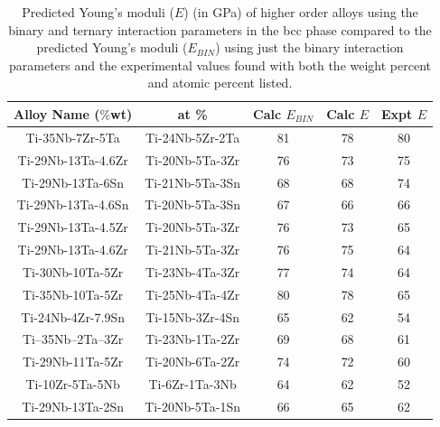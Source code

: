 \newpage
\begin{table}[H]
	\caption{Predicted Young's moduli ($E$) (in GPa) of higher order alloys using the binary and ternary interaction parameters in the bcc phase compared to the predicted Young's moduli ($E_{BIN}$) using just the binary interaction parameters and the experimental values found with both the weight percent and atomic percent listed.}
	\centering
	\begin{tabular}{ c c c c c }
		\hline
		Alloy Name ($\%$wt) & at \% & Calc $E_{BIN}$ & Calc $E$ & Expt $E$\\
		\hline
		Ti-35Nb-7Zr-5Ta \cite{Geetha2009} & Ti-24Nb-5Zr-2Ta & 81 & 78 & 80\\
		Ti-29Nb-13Ta-4.6Zr \cite{Geetha2009}  & Ti-20Nb-5Ta-3Zr & 76 & 73 & 75\\
		Ti-29Nb-13Ta-6Sn \cite{Geetha2009} & Ti-21Nb-5Ta-3Sn & 68 & 68 & 74\\
		Ti-29Nb-13Ta-4.6Sn \cite{Geetha2009} & Ti-20Nb-5Ta-3Sn & 67 & 66 & 66\\
		Ti-29Nb-13Ta-4.5Zr \cite{Geetha2009} & Ti-20Nb-5Ta-3Zr & 76 & 73 & 65\\
		Ti-29Nb-13Ta-4.6Zr \cite{Tane2010a} & Ti-21Nb-5Ta-3Zr & 76 & 75 & 64\\
		Ti-30Nb-10Ta-5Zr \cite{Tane2010a} & Ti-23Nb-4Ta-3Zr & 77 & 74 & 64\\
		Ti-35Nb-10Ta-5Zr \cite{Tane2010a} & Ti-25Nb-4Ta-4Zr & 80 & 78 & 65\\
		Ti-24Nb-4Zr-7.9Sn \cite{Mohammed2014} & Ti-15Nb-3Zr-4Sn & 65 & 62 & 54\\
		Ti–35Nb–2Ta–3Zr \cite{Mohammed2014} & Ti-23Nb-1Ta-2Zr & 69 & 68 & 61\\
		Ti-29Nb-11Ta-5Zr \cite{Mohammed2014} & Ti-20Nb-6Ta-2Zr & 74 & 72 & 60\\
		Ti-10Zr-5Ta-5Nb \cite{Mohammed2014} & Ti-6Zr-1Ta-3Nb & 64 & 62 & 52\\
		Ti-29Nb-13Ta-2Sn \cite{Mohammed2014} & Ti-20Nb-5Ta-1Sn & 66 & 65 & 62\\
		\hline
	\end{tabular}
	\label{Ch6-table:tixydatacomp}
\end{table}
\clearpage

